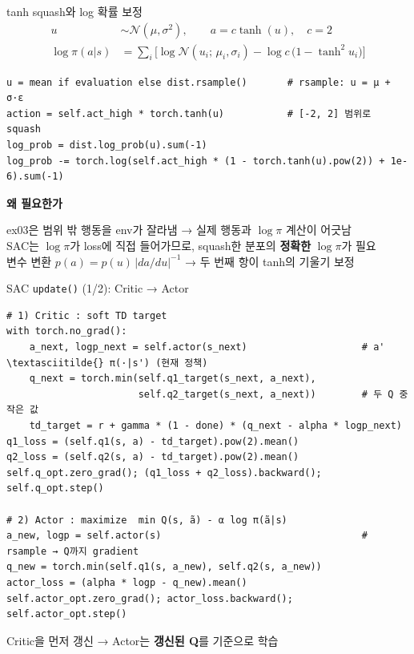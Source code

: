 \documentclass[aspectratio=169,11pt,xcolor=table]{beamer}
\newcommand{\boxtitle}[1]{{\bfseries\color{brand}#1}\par\smallskip}
\newcommand{\cc}[1]{\texttt{#1}}
\begin{document}
\begin{frame}[fragile]{tanh squash와 log 확률 보정}
  \vspace{-0.8em}
  \begin{align*}
    u &\sim \mathcal{N}(\mu, \sigma^2), \qquad a = c \tanh(u), \quad c = 2 \\
    \log\pi(a|s) &= \sum_i \Big[ \log\mathcal{N}(u_i;\, \mu_i, \sigma_i) - \log c\,\big(1 - \tanh^2 u_i\big) \Big]
  \end{align*}
\begin{lstlisting}
u = mean if evaluation else dist.rsample()       # rsample: u = μ + σ·ε
action = self.act_high * torch.tanh(u)           # [-2, 2] 범위로 squash
log_prob = dist.log_prob(u).sum(-1)
log_prob -= torch.log(self.act_high * (1 - torch.tanh(u).pow(2)) + 1e-6).sum(-1)
\end{lstlisting}
  \begin{keybox}
    \boxtitle{왜 필요한가}
    \small
    ex03은 범위 밖 행동을 env가 잘라냄 → 실제 행동과 $\log\pi$ 계산이 어긋남\\
    SAC는 $\log\pi$가 loss에 직접 들어가므로, squash한 분포의 \textbf{정확한} $\log\pi$가 필요\\
    변수 변환 $p(a) = p(u)\,|da/du|^{-1}$ → 두 번째 항이 tanh의 기울기 보정
  \end{keybox}
\end{frame}

\begin{frame}[fragile]{SAC \cc{update()} (1/2): Critic → Actor}
\begin{lstlisting}
# 1) Critic : soft TD target
with torch.no_grad():
    a_next, logp_next = self.actor(s_next)                    # a' \textasciitilde{} π(·|s') (현재 정책)
    q_next = torch.min(self.q1_target(s_next, a_next),
                       self.q2_target(s_next, a_next))        # 두 Q 중 작은 값
    td_target = r + gamma * (1 - done) * (q_next - alpha * logp_next)
q1_loss = (self.q1(s, a) - td_target).pow(2).mean()
q2_loss = (self.q2(s, a) - td_target).pow(2).mean()
self.q_opt.zero_grad(); (q1_loss + q2_loss).backward(); self.q_opt.step()

# 2) Actor : maximize  min Q(s, ã) - α log π(ã|s)
a_new, logp = self.actor(s)                                   # rsample → Q까지 gradient
q_new = torch.min(self.q1(s, a_new), self.q2(s, a_new))
actor_loss = (alpha * logp - q_new).mean()
self.actor_opt.zero_grad(); actor_loss.backward(); self.actor_opt.step()
\end{lstlisting}
  {\small Critic을 먼저 갱신 → Actor는 \textbf{갱신된 Q}를 기준으로 학습}
\end{frame}
\end{document}
